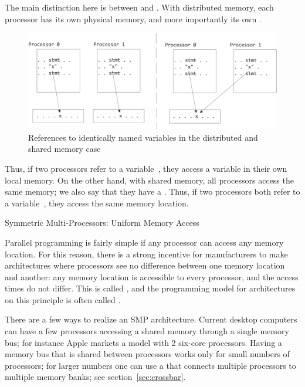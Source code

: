 The main distinction here is between
 and
. With distributed memory, each processor
has its own physical memory, and more importantly its own
.
\begin{figure}
  \includegraphics[scale=.1]{graphics/shared-distributed}
  \caption{References to identically named variables in the
    distributed and shared memory case}
  \label{fig:shared-distributed}
\end{figure}
Thus, if two processors refer to a variable~, they access a
variable in their own local memory. On the other hand, with shared
memory, all processors access the same memory; we also say that they
have a . Thus, if two processors
both refer to a variable~, they access the same memory location.

 {Symmetric Multi-Processors: Uniform Memory Access}
\label{sec:uma}

Parallel programming is fairly simple if any processor can access any
memory location. For this reason, there is a strong incentive for
manufacturers to make architectures where processors see no difference
between one memory location and another: any memory location is
accessible to every processor, and
the access times do not differ. This is called , and 
the programming model for
architectures on this principle is often called .

There are a few ways to realize an SMP architecture.  Current desktop
computers can have a few processors accessing a shared memory through
a single memory bus; for instance Apple markets a model with 2
six-core processors. Having a memory bus that is shared between
processors works only for small numbers of processors; for larger
numbers one can use a  that connects multiple
processors to multiple memory banks; see section~\ref{sec:crossbar}.

